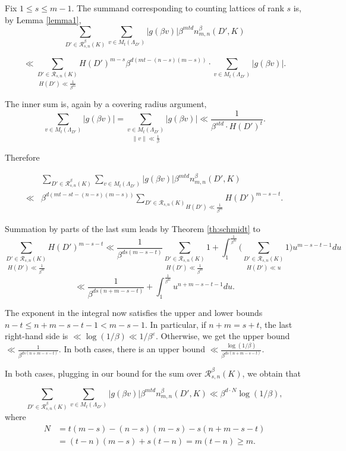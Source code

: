 \documentclass{amsart}
\begin{document}
Fix $1\le s \le  m-1$. The summand corresponding to counting lattices of rank $s$ is, by Lemma \ref{lemma1},$$
\sum_{D'\in\mathcal{R}_{s,n}^{\beta}(K)}\sum_{v\in M_t(\Lambda_{D'})}|g(\beta v)|\beta^{mtd}n^{\beta}_{m,n}(D',K)$$

$$\ll \underset{H(D')\ll\tfrac{1}{\beta^{ds}}}{\sum_{D'\in\mathcal{R}_{s,n}(K)}}H(D')^{m-s}\beta^{d(mt-(n-s)(m-s))}\cdot\sum_{v\in M_t(\Lambda_{D'})}|g(\beta v)|.
$$


The inner sum is, again by a covering radius argument,$$\sum_{v\in M_t(\Lambda_{D'})}|g(\beta v)|=\underset{\lVert v\rVert\ll\tfrac{1}{\beta}}{\sum_{v\in M_t(\Lambda_{D'})}}|g(\beta v)|\ll\frac{1}{\beta^{std}\cdot H(D')^t}.$$





Therefore

\begin{align}
& \sum_{D'\in\mathcal{R}_{s,n}^{\beta}(K)}\sum_{v\in M_t(\Lambda_{D'})}|g(\beta v)|\beta^{mtd}n^{\beta}_{m,n}(D',K)\\
\ll & \beta^{d(mt-st-(n-s)(m-s))}
\underset{H(D')\ll
\tfrac{1}{\beta^{ds}}}{\sum_{D'\in\mathcal{R}_{s,n}(K)}}
H(D')^{m-s-t}.
\end{align}


Summation by parts of the last sum leads by Theorem \ref{th:schmidt} to
{\small$$
\underset{H(D')\ll\tfrac{1}{\beta^{ds}}}{\sum_{D'\in\mathcal{R}_{s,n}(K)}}H(D')^{m-s-t}
\ll \frac{1}{\beta^{ds(m-s-t)}}\underset{H(D')\ll\tfrac{1}{\beta^{ds}}}{\sum_{D'\in\mathcal{R}_{s,n}(K)}}1+\int_{1}^{\frac{1}{\beta^{ds}}}\Big( \underset{H(D')\ll u}{\sum_{D'\in\mathcal{R}_{s,n}(K)}}1\Big) u^{m-s-t-1}du$$
$$
\ll\frac{1}{\beta^{ds(n+m-s-t)}}+\int_{1}^{\frac{1}{\beta^{ds}}}u^{n+m-s-t-1}du.
$$
}

The exponent in the integral now satisfies the upper and lower bounds $n-t\le n+m-s-t-1<m-s-1$. In particular, if $n+m=s+t$, the last right-hand side is $\ll\log(1/\beta) \ll 1/\beta^{\varepsilon}$.
Otherwise, we get the upper bound $\ll\tfrac{1}{\beta^{ds(n+m-s-t)}}$. In both cases, there is an upper bound $\ll \tfrac{\log(1/\beta)}{\beta^{ds(n+m-s-t)}}$.


In both cases, plugging in our bound for the sum over $\mathcal{R}_{s,n}^{\beta}(K)$, 
we obtain that 

$$\sum_{D'\in\mathcal{R}_{s,n}^{\beta}(K)}\sum_{v\in M_t(\Lambda_{D'})}|g(\beta v)|\beta^{mtd}n^{\beta}_{m,n}(D',K)\ll\beta^{d \cdot  N }\log(1/\beta),$$
where 
\begin{align}
	N  & =  t(m-s) -(n-s)(m-s) - s(n+m-s-t) \\
	   & = (t-n)(m-s) +s(t-n) = m(t-n) \geq m.
\end{align}
\end{document}
